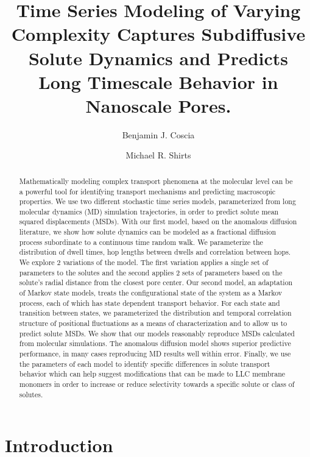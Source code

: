 \documentclass{article}
\title{Time Series Modeling of Varying Complexity Captures Subdiffusive Solute Dynamics
and Predicts Long Timescale Behavior in Nanoscale Pores.}
\author{Benjamin J. Coscia \and Michael R. Shirts}
\begin{document}
  \graphicspath{{./figures/}}
  \maketitle
  
  \begin{abstract}
  Mathematically modeling complex transport phenomena at the molecular level 
  can be a powerful tool for identifying transport mechanisms and predicting
  macroscopic properties. We use two different stochastic time series models,
  parameterized from long molecular dynamics (MD) simulation trajectories, in order
  to predict solute mean squared displacements (MSDs). With our first model, based
  on the anomalous diffusion literature, we show how solute dynamics can be modeled as
  a fractional diffusion process subordinate to a continuous time random walk.
  We parameterize the distribution of dwell times, hop lengths between dwells and
  correlation between hops. We explore 2 variations of the model. The first variation
  applies a single set of parameters to the solutes and the second applies 2 sets
  of parameters based on the solute's radial distance from the closest pore center.
  Our second model, an adaptation of Markov state models, treats the configurational
  state of the system as a Markov process, each of which has state dependent 
  transport behavior. For each state and transition between states, we parameterized
  the distribution and temporal correlation structure of positional fluctuations as
  a means of characterization and to allow us to predict solute MSDs.
  We show that our models reasonably reproduce MSDs calculated from molecular 
  simulations. The anomalous diffusion model shows superior predictive performance, 
  in many cases reproducing MD results well within error. Finally, we use the 
  parameters of each model to identify specific differences in solute transport
  behavior which can help suggest modifications that can be made to LLC membrane 
  monomers in order to increase or reduce selectivity towards a specific solute
  or class of solutes.

  \end{abstract}

  \section{Introduction}
  
\end{document}
